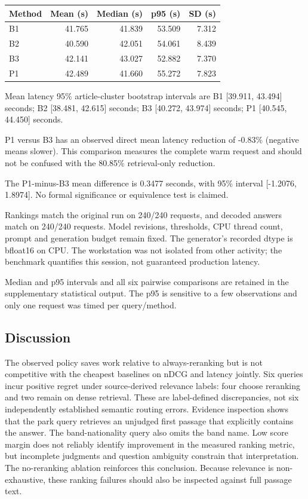 \begin{longtable}[]{@{}lrrrr@{}}
\toprule
Method & Mean (s) & Median (s) & p95 (s) & SD (s)\tabularnewline
\midrule
\endhead
B1 & 41.765 & 41.839 & 53.509 & 7.312\tabularnewline
B2 & 40.590 & 42.051 & 54.061 & 8.439\tabularnewline
B3 & 42.141 & 43.027 & 52.882 & 7.370\tabularnewline
P1 & 42.489 & 41.660 & 55.272 & 7.823\tabularnewline
\bottomrule
\end{longtable}

Mean latency 95\% article-cluster bootstrap intervals are B1 {[}39.911,
43.494{]} seconds; B2 {[}38.481, 42.615{]} seconds; B3 {[}40.272,
43.974{]} seconds; P1 {[}40.545, 44.450{]} seconds.

P1 versus B3 has an observed direct mean latency reduction of -0.83\%
(negative means slower). This comparison measures the complete warm
request and should not be confused with the 80.85\% retrieval-only
reduction.

The P1-minus-B3 mean difference is 0.3477 seconds, with 95\% interval
{[}-1.2076, 1.8974{]}. No formal significance or equivalence test is
claimed.

Rankings match the original run on 240/240 requests, and decoded answers
match on 240/240 requests. Model revisions, thresholds, CPU thread
count, prompt and generation budget remain fixed. The generator's
recorded dtype is bfloat16 on CPU. The workstation was not isolated from
other activity; the benchmark quantifies this session, not guaranteed
production latency.

Median and p95 intervals and all six pairwise comparisons are retained
in the supplementary statistical output. The p95 is sensitive to a few
observations and only one request was timed per query/method.

\hypertarget{discussion}{%
\subsection{Discussion}\label{discussion}}

The observed policy saves work relative to always-reranking but is not
competitive with the cheapest baselines on nDCG and latency jointly. Six
queries incur positive regret under source-derived relevance labels:
four choose reranking and two remain on dense retrieval. These are
label-defined discrepancies, not six independently established semantic
routing errors. Evidence inspection shows that the park query retrieves
an unjudged first passage that explicitly contains the answer. The
band-nationality query also omits the band name. Low score margin does
not reliably identify improvement in the measured ranking metric, but
incomplete judgments and question ambiguity constrain that
interpretation. The no-reranking ablation reinforces this conclusion.
Because relevance is non-exhaustive, these ranking failures should also
be inspected against full passage text.

